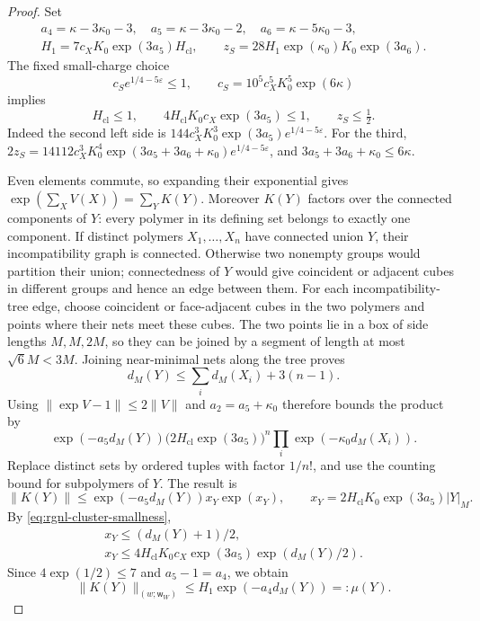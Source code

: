 \begin{proof}
Set
\[
 \begin{gathered}
 a_4=\kappa-3\kappa_0-3,\quad
 a_5=\kappa-3\kappa_0-2,\quad
 a_6=\kappa-5\kappa_0-3,\\
 H_1=7c_XK_0\exp(3a_5)H_{\mathrm{cl}},\qquad
 z_S=28H_1\exp(\kappa_0)K_0\exp(3a_6).
 \end{gathered}
\]
The fixed small-charge choice
\[
 c_S e^{1/4-5\varepsilon}\le1,\qquad
 c_S=10^5c_X^5K_0^5\exp(6\kappa)
\]
implies
\begin{equation}\label{eq:rgnl-cluster-smallness}
 H_{\mathrm{cl}}\le1,\qquad
 4H_{\mathrm{cl}}K_0c_X\exp(3a_5)\le1,\qquad
                                      z_S\le\tfrac12.
\end{equation}
Indeed the second left side is
$144c_X^3K_0^3\exp(3a_5)e^{1/4-5\varepsilon}$.
For the third,
$2z_S=14112c_X^3K_0^4
\exp(3a_5+3a_6+\kappa_0)e^{1/4-5\varepsilon}$, and
$3a_5+3a_6+\kappa_0\le6\kappa$.

Even elements commute, so expanding their exponential
gives $\exp(\sum_XV(X))=\sum_YK(Y)$.
Moreover $K(Y)$ factors over the connected components
of $Y$: every polymer in its defining set belongs to
exactly one component.
If distinct polymers $X_1,\ldots,X_n$ have connected
union $Y$, their incompatibility graph is connected.
Otherwise two nonempty groups would partition their
union; connectedness of $Y$ would give coincident or
adjacent cubes in different groups and hence an edge
between them.
For each incompatibility-tree edge, choose coincident or
face-adjacent cubes in the two polymers and points
where their nets meet these cubes. The two points
lie in a box of side lengths $M,M,2M$, so they
can be joined by a segment of length at most
$\sqrt6M<3M$. Joining near-minimal nets along
the tree proves
\[
 d_M(Y)\le\sum_i d_M(X_i)+3(n-1).
\]
Using $\|\exp V-1\|\le2\|V\|$ and $a_2=a_5+\kappa_0$
therefore bounds the product by
\[
 \exp(-a_5d_M(Y))
       \big(2H_{\mathrm{cl}}\exp(3a_5)\big)^n
                                  \prod_i \exp(-\kappa_0d_M(X_i)).
\]
Replace distinct sets by ordered tuples with factor $1/n!$,
and use the counting bound for subpolymers of $Y$. The result is
\[
 \|K(Y)\|\le \exp(-a_5d_M(Y))x_Y\exp(x_Y),\qquad
 x_Y=2H_{\mathrm{cl}}K_0\exp(3a_5)|Y|_M.
\]
By \eqref{eq:rgnl-cluster-smallness},
\[
 \begin{gathered}
 x_Y\le(d_M(Y)+1)/2,\\
 x_Y\le4H_{\mathrm{cl}}K_0c_X\exp(3a_5)\exp(d_M(Y)/2).
 \end{gathered}
\]
Since $4\exp(1/2)\le7$ and $a_5-1=a_4$, we obtain
\begin{equation}\label{eq:rgnl-Mayer-bound}
 \|K(Y)\|_{(w;\mathsf w_W)}
                         \le H_1\exp(-a_4d_M(Y))=:\mu(Y).
\end{equation}


\end{proof}
